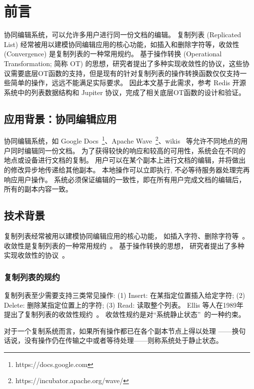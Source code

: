 \chapter{前言}
协同编辑系统，可以允许多用户进行同一份文档的编辑。
复制列表 (Replicated List) 经常被用以建模协同编辑应用的核心功能，如插入和删除字符等，收敛性 (Convergence) 是复制列表的一种常用规约。
基于操作转换 (Operational Transformation; 简称 OT) 的思想，研究者提出了多种实现收敛性的协议，这些协议需要底层OT函数的支持，但是现有的针对复制列表的操作转换函数仅仅支持一些简单的操作，远远不能满足实际要求。
因此本文基于此需求，参考 Redis 开源系统中的列表数据结构和 Jupiter 协议，完成了相关底层OT函数的设计和验证。


\section{应用背景：协同编辑应用}

协同编辑系统，如 Google Docs~\footnote{https://docs.google.com}、Apache Wave~\footnote{https://incubator.apache.org/wave/}、wikis~\cite{Leuf:Wiki01} 
等允许不同地点的用户同时编辑同一份文档。
为了获得较快的响应和较高的可用性，系统会在不同的地点或设备进行文档的复制。
用户可以在某个副本上进行文档的编辑，并将做出的修改异步地传递给其他副本。
本地操作可以立即执行, 不必等待服务器处理完再响应用户操作。
系统必须保证编辑的一致性，即在所有用户完成文档的编辑后，所有的副本内容一致。

\section{技术背景}

复制列表经常被用以建模协同编辑应用的核心功能，
如插入字符、删除字符等~\cite{Ellis:SIGMOD89, Nichols:UIST95, Attiya:PODC16}。
收敛性是复制列表的一种常用规约~\cite{Ellis:SIGMOD89}。
基于操作转换的思想，
研究者提出了多种实现收敛性的协议~\cite{Ellis:SIGMOD89, Prakash:TOCHI94, Nichols:UIST95, Sun:TOCHI98, Sun:CSCW98, 
Vidot:CSCW00, Shen:CSCW02, Sun:TOCHI02, Li:ICPADS04, Sun:TPDS09, Sun:CSCW14}。

\subsection{复制列表的规约}
复制列表至少需要支持三类常见操作: 
(1) Insert: 在某指定位置插入给定字符;
(2) Delete: 删除某指定位置上的字符;
(3) Read: 读取整个列表。
%
Ellis 等人在1989年提出了复制列表的收敛性规约~\cite{Ellis:SIGMOD89}。
收敛性规约是对``系统静止状态''~\cite{Ellis:SIGMOD89}的一种约束。
\begin{definition}
  对于一个复制系统而言，如果所有操作都已在各个副本节点上得以处理
  ——换句话说，没有操作仍在传输之中或者等待处理——则称系统处于静止状态。
\end{definition}

